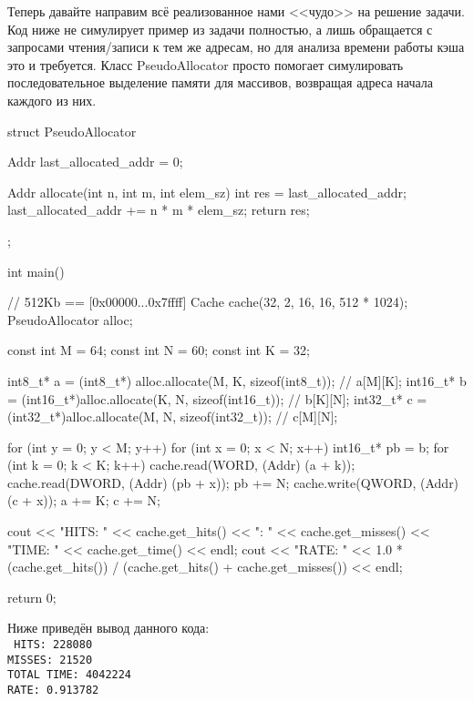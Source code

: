 \documentclass[14pt, russian, onesize]{extreport}
\begin{document}
Теперь давайте направим всё реализованное нами <<чудо>> на решение задачи.
Код ниже не симулирует пример из задачи полностью, а лишь обращается
с запросами чтения\slash записи
к тем же адресам, но для анализа времени работы кэша это и требуется.
Класс PseudoAllocator просто помогает симулировать
последовательное выделение памяти для массивов, возвращая 
адреса начала каждого из них.

\begin{cppcode}
struct PseudoAllocator {
    Addr last_allocated_addr = 0;
    
    Addr allocate(int n, int m, int elem_sz) {
        int res = last_allocated_addr;
        last_allocated_addr += n * m * elem_sz;
        return res;
    }
};

int main() {
    // 512Kb == [0x00000...0x7ffff]
    Cache cache(32, 2, 16, 16, 512 * 1024);
    PseudoAllocator alloc;

    const int M = 64;
    const int N = 60;
    const int K = 32;

    int8_t*  a = (int8_t*) alloc.allocate(M, K, sizeof(int8_t));  // a[M][K];
    int16_t* b = (int16_t*)alloc.allocate(K, N, sizeof(int16_t)); // b[K][N];
    int32_t* c = (int32_t*)alloc.allocate(M, N, sizeof(int32_t)); // c[M][N];

    for (int y = 0; y < M; y++) {
        for (int x = 0; x < N; x++) {
            int16_t* pb = b;
            for (int k = 0; k < K; k++) {
                cache.read(WORD, (Addr) (a + k));
                cache.read(DWORD, (Addr) (pb + x));
                pb += N;
            }
            cache.write(QWORD, (Addr) (c + x));
        }
        a += K;
        c += N;
    }

    cout << "HITS: " << cache.get_hits() << "\nMISSES: " << cache.get_misses() << "\nTOTAL TIME: " << cache.get_time() << endl;
    cout << "RATE: " << 1.0 * (cache.get_hits()) / (cache.get_hits() + cache.get_misses()) << endl;

    return 0;
}
\end{cppcode}
Ниже приведён вывод данного кода:\\
\texttt{
HITS: 228080 \\
MISSES: 21520 \\
TOTAL TIME: 4042224\\
RATE: 0.913782\\
}
\end{document}
